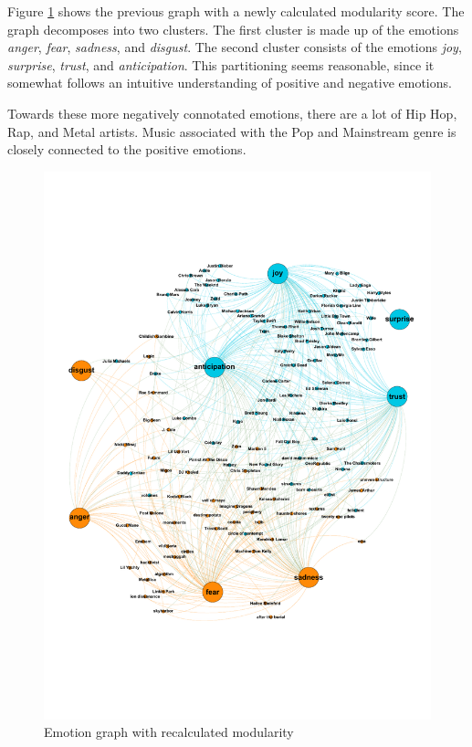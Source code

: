 \documentclass[10pt,a4paper]{article}
\begin{document}
		Figure \ref{fig:emotionnewmod} shows the previous graph with a newly calculated modularity score. The graph decomposes into two clusters. The first cluster is made up of the emotions \textit{anger}, \textit{fear}, \textit{sadness}, and \textit{disgust}. The second cluster consists of the emotions \textit{joy}, \textit{surprise}, \textit{trust}, and \textit{anticipation}. This partitioning seems reasonable, since it somewhat follows an intuitive understanding of positive and negative emotions.
		
		Towards these more negatively connotated emotions, there are a lot of Hip Hop, Rap, and Metal artists. Music associated with the Pop and Mainstream genre is closely connected to the positive emotions.
		
		\begin{figure}[htb]
			\centering
			\includegraphics[trim=0mm 50mm 0mm 45mm, clip, width=\linewidth]{data/emotion_graph_new_modularity}
			\caption{Emotion graph with recalculated modularity}
			\label{fig:emotionnewmod}
		\end{figure}
		
\end{document}
